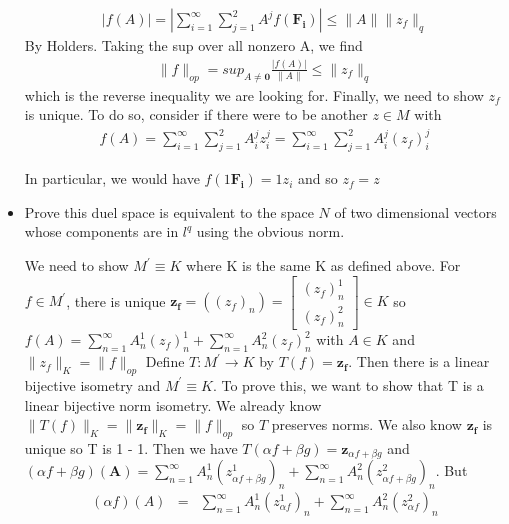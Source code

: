 \documentclass[11pt]{SelfArxOneColBMN}
\begin{document}
\begin{exercise}
\begin{itemize}
\begin{solution}
                \begin{eqnarray*}
                    |f(A)| = |\sum_{i=1}^\infty\sum_{j=1}^2A^jf(\mathbf{F_i})| \leq \|A\| \|z_f\|_q
                \end{eqnarray*}
                By Holders. Taking the sup over all nonzero A, we find
                \begin{eqnarray*}
                    \|f\|_{op} =sup_{A \neq \mathbf{0}}\frac{|f(A)|}{\|A\|} \leq \|z_f\|_q
                \end{eqnarray*}
                which is the reverse inequality we are looking for. Finally, we need to show $z_f$ is unique. To do so, consider if there were to be another $z \in M$ with 
                \begin{eqnarray*}
                    f(A) = \sum_{i=1}^\infty\sum_{j=1}^2A_i^jz_i^j = \sum_{i=1}^\infty\sum_{j=1}^2A_i^j(z_f)^j_i
                \end{eqnarray*}
        \end{solution}
        In particular, we would have $f(1\mathbf{F_i}) = 1z_i$ and so $z_f = z$
        \item Prove this duel space is equivalent to the space $N$ of two dimensional vectors whose components are in $l^q$ using the obvious norm.
        \begin{solution}
            We need to show $M^\prime \equiv K$ where K is the same K as defined above. For $f \in M^\prime$, there is unique $\mathbf{z_f} = ((z_f)_n) =
            \begin{bmatrix}
                (z_f)_n^1\\
                (z_f)_n^2
            \end{bmatrix}
             \in K$
        so $f(A) = \sum_{n=1}^\infty A_n^1(z_f)_n^1 + \sum_{n=1}^\infty A_n^2(z_f)_n^2$ with $A \in K$ and $\|z_f\|_K = \|f\|_{op}$ Define $T: M^\prime \rightarrow K$ by $T(f) = \mathbf{z_f}$. Then there is a linear bijective isometry and $M^\prime \equiv K$. To prove this, we want to show that T is a linear bijective norm isometry. We already know $\|T(f)\|_K = \|\mathbf{z_f}\|_K = \|f\|_{op}$ so $T$ preserves norms. We also know $\mathbf{z_f}$ is unique so T is 1 - 1. Then we have $T(\alpha f + \beta g) = \mathbf{z}_{\alpha f + \beta g}$ and $(\alpha f + \beta g)(\mathbf{A}) = \sum_{n = 1}^\infty A_n^1(z_{\alpha f + \beta g}^1)_n + \sum_{n = 1}^\infty A_n^2(z_{\alpha f + \beta g}^2)_n$. But
        \begin{eqnarray*}
            (\alpha f)(A) &=& \sum_{n=1}^\infty A_n^1(z_{\alpha f}^1)_n + \sum_{n=1}^\infty A_n^2(z_{\alpha f}^2)_n\\

\end{eqnarray*}
\end{solution}
\end{itemize}
\end{exercise}
\end{document}
